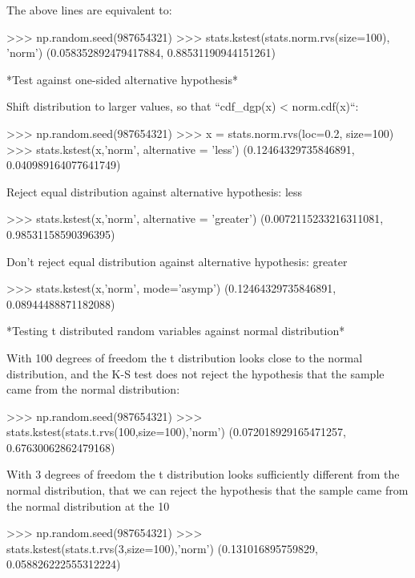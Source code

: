 \begin{DoxyVerb}
The above lines are equivalent to:

>>> np.random.seed(987654321)
>>> stats.kstest(stats.norm.rvs(size=100), 'norm')
(0.058352892479417884, 0.88531190944151261)

*Test against one-sided alternative hypothesis*

Shift distribution to larger values, so that ``cdf_dgp(x) < norm.cdf(x)``:

>>> np.random.seed(987654321)
>>> x = stats.norm.rvs(loc=0.2, size=100)
>>> stats.kstest(x,'norm', alternative = 'less')
(0.12464329735846891, 0.040989164077641749)

Reject equal distribution against alternative hypothesis: less

>>> stats.kstest(x,'norm', alternative = 'greater')
(0.0072115233216311081, 0.98531158590396395)

Don't reject equal distribution against alternative hypothesis: greater

>>> stats.kstest(x,'norm', mode='asymp')
(0.12464329735846891, 0.08944488871182088)

*Testing t distributed random variables against normal distribution*

With 100 degrees of freedom the t distribution looks close to the normal
distribution, and the K-S test does not reject the hypothesis that the
sample came from the normal distribution:

>>> np.random.seed(987654321)
>>> stats.kstest(stats.t.rvs(100,size=100),'norm')
(0.072018929165471257, 0.67630062862479168)

With 3 degrees of freedom the t distribution looks sufficiently different
from the normal distribution, that we can reject the hypothesis that the
sample came from the normal distribution at the 10%

>>> np.random.seed(987654321)
>>> stats.kstest(stats.t.rvs(3,size=100),'norm')
(0.131016895759829, 0.058826222555312224)\end{DoxyVerb}
 \hypertarget{namespacescipy_1_1stats_1_1stats_a9d516fe8283e7c7a3bee49903bbf4c64}{}
